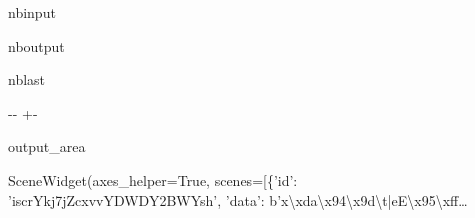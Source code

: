 \documentclass[letterpaper,10pt,english]{sphinxmanual}
\begin{document}
\begin{sphinxuseclass}{nbinput}
{
\begin{sphinxVerbatim}[commandchars=\\\{\}]
\llap{\color{nbsphinxin}[6]:\,\hspace{\fboxrule}\hspace{\fboxsep}}
 
              
             
              
\end{sphinxVerbatim}
}

\end{sphinxuseclass}
\begin{sphinxuseclass}{nboutput}
\begin{sphinxuseclass}{nblast}
{

\kern-\sphinxverbatimsmallskipamount\kern-\baselineskip
\kern+\FrameHeightAdjust\kern-\fboxrule
\vspace{\nbsphinxcodecellspacing}

\begin{sphinxuseclass}{output_area}
\begin{sphinxuseclass}{}


\begin{sphinxVerbatim}[commandchars=\\\{\}]
\llap{\color{nbsphinxout}[6]:\,\hspace{\fboxrule}\hspace{\fboxsep}}SceneWidget(axes\_helper=True, scenes=[\{'id': 'iscrYkj7jZcxvvYDWDY2BWYsh', 'data': b'x\textbackslash{}xda\textbackslash{}x94\textbackslash{}x9d\textbackslash{}t|eE\textbackslash{}x95\textbackslash{}xff…
\end{sphinxVerbatim}



\end{sphinxuseclass}
\end{sphinxuseclass}
}

\end{sphinxuseclass}
\end{sphinxuseclass}
\sphinxstepscope
\end{document}
